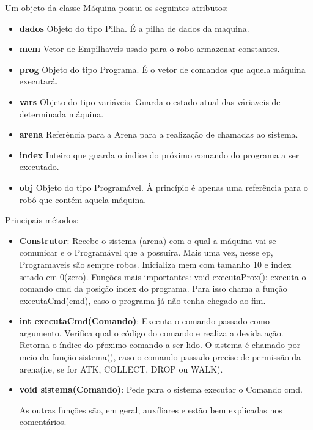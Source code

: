 \documentclass[11pt]{article}
\begin{document}
Um objeto da classe Máquina possui os seguintes atributos:
\begin{itemize}

\item \textbf{dados}
	Objeto do tipo Pilha. É a pilha de dados da maquina.
\item \textbf{mem}
	Vetor de Empilhaveis usado para o robo armazenar constantes.
\item \textbf{prog}
	Objeto do tipo Programa. É o vetor de comandos que aquela máquina executará.
\item \textbf{vars}
	Objeto do tipo variáveis. Guarda o estado atual das váriaveis de determinada máquina.
\item \textbf{arena}
	Referência para a Arena para a realização de chamadas ao sistema.
\item \textbf{index}
	Inteiro que guarda o índice do próximo comando do programa a ser executado.
\item \textbf{obj}
	Objeto do tipo Programável. À princípio é apenas uma referência para o robô que contém aquela máquina.
\end{itemize}


Principais métodos:

\begin{itemize}

	\item \textbf{Construtor}: Recebe o sistema (arena) com o qual a máquina vai se comunicar e o Programável que a possuíra.
				Mais uma vez, nesse ep, Programaveis são sempre robos. Inicializa mem com tamanho 10 e index setado em 0(zero).
	Funções mais importantes:
		void executaProx(): executa o comando cmd da posição index do programa. Para isso chama a função executaCmd(cmd), caso o programa já não tenha chegado ao fim.
		
	\item \textbf{{\color{red}int} executaCmd({\color{red}Comando})}: Executa o comando passado como argumento. Verifica  qual o código do comando e realiza a devida ação.
									 Retorna o índice do pŕoximo comando a ser lido. O sistema é chamado por meio da função sistema(), caso o comando passado precise de permissão da arena(i.e, se for ATK, COLLECT, DROP ou WALK).

	\item \textbf{{\color{red}void} sistema({\color{red}Comando})}:	 Pede para o sistema executar o Comando cmd.

		As outras funções são, em geral, auxíliares e estão bem explicadas nos comentários.

\end{itemize}
\end{document}
